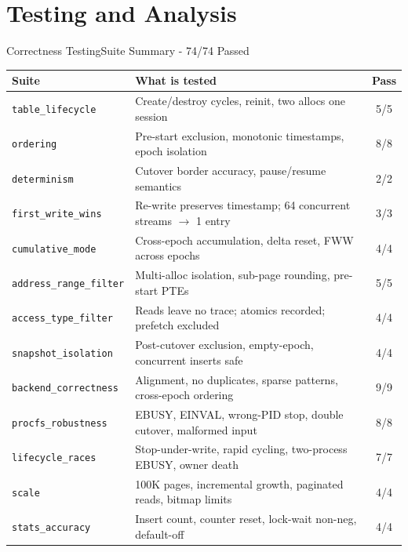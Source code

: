 \section{Testing and Analysis}

\begin{frame}{Correctness Testing}{Suite Summary - 74/74 Passed}
\vspace{-2mm}
\begin{center}
\scriptsize
\setlength{\tabcolsep}{3pt}
\begin{tabular}{lp{8.5cm}c}
\toprule
\textbf{Suite} & \textbf{What is tested} & \textbf{Pass} \\
\midrule
\texttt{table\_lifecycle}        & Create/destroy cycles, reinit, two allocs one session              & 5/5 \\
\texttt{ordering}                & Pre-start exclusion, monotonic timestamps, epoch isolation         & 8/8 \\
\texttt{determinism}             & Cutover border accuracy, pause/resume semantics                    & 2/2 \\
\texttt{first\_write\_wins}      & Re-write preserves timestamp; 64 concurrent streams $\to$ 1 entry & 3/3 \\
\texttt{cumulative\_mode}        & Cross-epoch accumulation, delta reset, FWW across epochs           & 4/4 \\
\texttt{address\_range\_filter} & Multi-alloc isolation, sub-page rounding, pre-start PTEs           & 5/5 \\
\texttt{access\_type\_filter}   & Reads leave no trace; atomics recorded; prefetch excluded          & 4/4 \\
\texttt{snapshot\_isolation}     & Post-cutover exclusion, empty-epoch, concurrent inserts safe       & 4/4 \\
\texttt{backend\_correctness}    & Alignment, no duplicates, sparse patterns, cross-epoch ordering    & 9/9 \\
\texttt{procfs\_robustness}      & EBUSY, EINVAL, wrong-PID stop, double cutover, malformed input     & 8/8 \\
\texttt{lifecycle\_races}        & Stop-under-write, rapid cycling, two-process EBUSY, owner death   & 7/7 \\
\texttt{scale}                   & 100K pages, incremental growth, paginated reads, bitmap limits     & 4/4 \\
\texttt{stats\_accuracy}         & Insert count, counter reset, lock-wait non-neg, default-off        & 4/4 \\

\end{tabular}
\end{center}
\end{frame}
